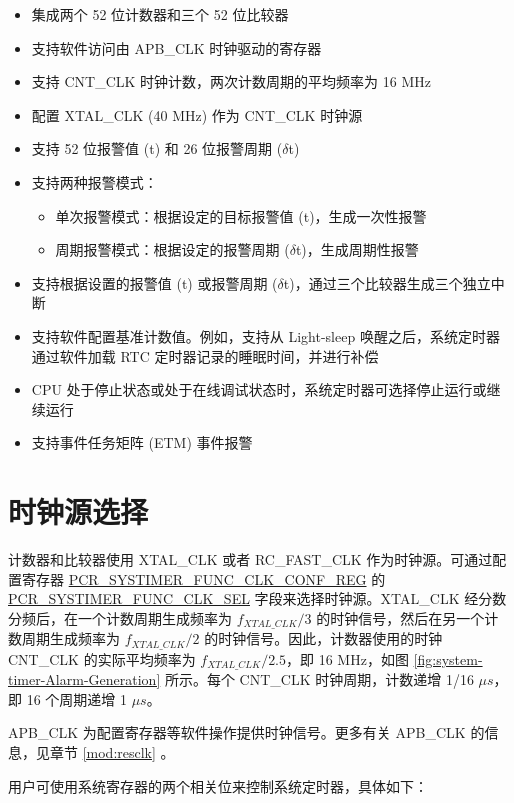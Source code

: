 \documentclass[main\_\_CN.tex]{subfiles}
\begin{document}
\begin{itemize}
    \item 集成两个 52 位计数器和三个 52 位比较器
    \item 支持软件访问由 APB\_CLK 时钟驱动的寄存器
    \item 支持 CNT\_CLK 时钟计数，两次计数周期的平均频率为 16 MHz
    \item 配置 XTAL\_CLK (40 MHz) 作为 CNT\_CLK 时钟源
    \item 支持 52 位报警值 (t) 和 26 位报警周期 ($\delta$t)
    \item 支持两种报警模式：
    \begin{itemize}
        \item 单次报警模式：根据设定的目标报警值 (t)，生成一次性报警
        \item 周期报警模式：根据设定的报警周期 ($\delta$t)，生成周期性报警
    \end{itemize}
    \item 支持根据设置的报警值 (t) 或报警周期 ($\delta$t)，通过三个比较器生成三个独立中断
    \item 支持软件配置基准计数值。例如，支持从 Light-sleep 唤醒之后，系统定时器通过软件加载 RTC 定时器记录的睡眠时间，并进行补偿
    \item CPU 处于停止状态或处于在线调试状态时，系统定时器可选择停止运行或继续运行
    \item 支持事件任务矩阵 (ETM) 事件报警
\end{itemize}

\section{时钟源选择}
计数器和比较器使用 XTAL\_CLK 或者 RC\_FAST\_CLK 作为时钟源。可通过配置寄存器 \hyperref[regdesc:PCRSYSTIMERFUNCCLKCONFREG]{PCR\_SYSTIMER\_FUNC\_CLK\_CONF\_REG} 的 \hyperref[fielddesc:PCRSYSTIMERFUNCCLKSEL]{PCR\_SYSTIMER\_FUNC\_CLK\_SEL} 字段来选择时钟源。XTAL\_CLK 经分数分频后，在一个计数周期生成频率为 $f_{XTAL\_CLK}/3$ 的时钟信号，然后在另一个计数周期生成频率为 $f_{XTAL\_CLK}/2$ 的时钟信号。因此，计数器使用的时钟 CNT\_CLK 的实际平均频率为 $f_{XTAL\_CLK}/2.5$，即 16 MHz，如图 \ref{fig:system-timer-Alarm-Generation} 所示。每个 CNT\_CLK 时钟周期，计数递增 1/16 $\mu s$，即 16 个周期递增 1 $\mu s$。

APB\_CLK 为配置寄存器等软件操作提供时钟信号。更多有关 APB\_CLK 的信息，见章节 \ref{mod:resclk} \textit{}。

用户可使用系统寄存器的两个相关位来控制系统定时器，具体如下：
\end{document}

